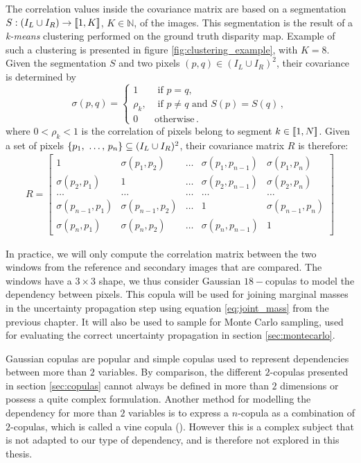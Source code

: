 The correlation values inside the covariance matrix are based on a segmentation $S:(I_L\cup I_R)\rightarrow{[\![}1,K{]\!]}$, $K\in\mathbb{N}$, of the images. This segmentation is the result of a \textit{k-means} clustering performed on the ground truth disparity map. Example of such a clustering is presented in figure \ref{fig:clustering_example}, with $K=8$. Given the segmentation $S$ and two pixels $(p, q)\in(I_L\cup I_R)^2$, their covariance is determined by
\begin{equation}\label{eq:correlation}
    \sigma(p, q) =
    \begin{cases}
        1 &\text{ if }p=q,\\
        \rho_k, &\text{ if } p\ne q\text{ and }S(p)=S(q)\,, \\
        0 & \text{otherwise}\,.
    \end{cases}
\end{equation}
where $0<\rho_k<1$ is the correlation of pixels belong to segment $k\in{[\![} 1, N{]\!]}$. Given a set of pixels $\{p_1 {, ~\dots, ~} p_n\}\subseteq(I_L\cup I_R)^2$, their covariance matrix $R$ is therefore:
\begin{align}
    R = \begin{bmatrix}
        1 & \sigma(p_{1}, p_{2}) & \dots & \sigma(p_{1}, p_{n-1}) & \sigma(p_{1}, p_{n})\\
        \sigma(p_{2}, p_{1}) & 1 & \dots & \sigma(p_{2}, p_{n-1}) & \sigma(p_{2}, p_{n})\\
        \dots & \dots & \dots & \dots & \dots\\
        \sigma(p_{n-1}, p_{1}) & \sigma(p_{n-1}, p_{2}) & \dots & 1 & \sigma(p_{n-1}, p_{n})\\
        \sigma(p_{n}, p_{1}) & \sigma(p_{n}, p_{2}) & \dots & \sigma(p_{n}, p_{n-1}) & 1
    \end{bmatrix}
\end{align}

In practice, we will only compute the correlation matrix between the two windows from the reference and secondary images that are compared. The windows have a $3\times 3$ shape, we thus consider Gaussian $18-$copulas to model the dependency between pixels. This copula will be used for joining marginal masses in the uncertainty propagation step using equation \eqref{eq:joint_mass} from the previous chapter. It will also be used to sample for Monte Carlo sampling, used for evaluating the correct uncertainty propagation in section \ref{sec:montecarlo}.

\begin{remark}
    Gaussian copulas are popular and simple copulas used to represent dependencies between more than $2$ variables. By comparison, the different $2$-copulas presented in section \ref{sec:copulas} cannot always be defined in more than $2$ dimensions or possess a quite complex formulation. Another method for modelling the dependency for more than $2$ variables is to express a $n$-copula as a combination of $2$-copulas, which is called a vine copula (\cite{czado_vine_2022}). However this is a complex subject that is not adapted to our type of dependency, and is therefore not explored in this thesis.
\end{remark}

